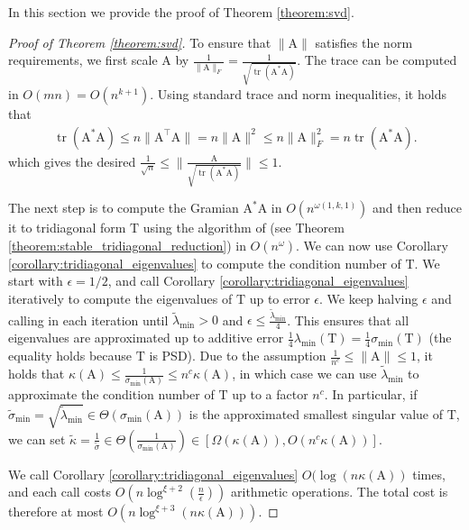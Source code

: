 \documentclass{article}
\newcommand{\lbrac}{\left[}
\newcommand{\rbrac}{\right]}
\newcommand{\lpar}{\left(}
\newcommand{\rpar}{\right)}
\DeclareMathOperator{\tr}{tr}
\newcommand\matA{\boldsymbol{\mathrm{A}}}
\newcommand\matT{\boldsymbol{\mathrm{T}}}
\newcommand{\cfmm}{\xi}
\begin{document}
In this section we provide the proof of Theorem \ref{theorem:svd}. 
\begin{proof}[Proof of Theorem \ref{theorem:svd}]
        To ensure that $\|\matA\|$  satisfies the norm requirements, we first scale $\matA$ by $\frac{1}{\|\matA\|_F}=\frac{1}{\sqrt{\tr(\matA^*\matA)}}$. The trace can be computed in $O(mn)=O(n^{k+1})$. Using standard trace and norm inequalities,  it holds that
        \begin{align*}
            \tr(\matA^*\matA) \leq n\|\matA^\top\matA\| = n \|\matA\|^2 \leq n \|\matA\|_F^2 = n\tr(\matA^*\matA).
        \end{align*}
        which gives the desired $\frac{1}{\sqrt{n}} \leq \|\tfrac{\matA}{\sqrt{\tr(\matA^*\matA)}}\| \leq 1$.
    
        The next step is to compute the Gramian $\matA^*\matA$ in $O(n^{\omega(1,k,1)})$ and then reduce it to tridiagonal form $\matT$ using the algorithm of \cite{schonhage1972unitare} (see Theorem \ref{theorem:stable_tridiagonal_reduction}) in $O(n^\omega)$. We can now use Corollary \ref{corollary:tridiagonal_eigenvalues} to compute the condition number of $\matT$. We start with $\epsilon=1/2$, and call Corollary \ref{corollary:tridiagonal_eigenvalues} iteratively to compute the eigenvalues of $\matT$ up to error $\epsilon$. We keep halving $\epsilon$ and calling in each iteration until $\widetilde\lambda_{\min}>0$ and $\epsilon\leq \frac{\widetilde\lambda_{\min}}{4}$. This ensures that all eigenvalues are approximated up to additive error $\tfrac{1}{4}\lambda_{\min}(\matT)=\tfrac{1}{4}\sigma_{\min}(\matT)$ (the equality holds because $\matT$ is PSD). Due to the assumption $\frac{1}{n^c}\leq \|\matA\|\leq 1$, it holds that 
        $\kappa(\matA)\leq \frac{1}{\sigma_{\min}(\matA)}\leq n^c\kappa(\matA)$, 
        in which case we can use $\widetilde\lambda_{\min}$ to approximate the condition number of $\matT$ up to a factor $n^c$. In particular, if $\widetilde\sigma_{\min}
        =\sqrt{\widetilde\lambda_{\min}}\in\Theta(\sigma_{\min}(\matA))$ is the approximated smallest singular value of $\matT$,  we can set $
        \widetilde\kappa=\frac{1}{\widetilde\sigma}\in \Theta(\frac{1}{\sigma_{\min}(\matA)}) \in \lbrac \Omega(\kappa(\matA)), O(n^c\kappa(\matA)) \rbrac
        $. 
        
        We call Corollary \ref{corollary:tridiagonal_eigenvalues} $O(\log(n\kappa(\matA))$ times, and each call costs $O\lpar n\log^{\cfmm+2}(\tfrac{n}{\epsilon})\rpar$ arithmetic operations.
        The total cost is therefore at most $O\lpar n\log^{\cfmm+3}(n\kappa(\matA))\rpar$.
        

\end{proof}
\end{document}

